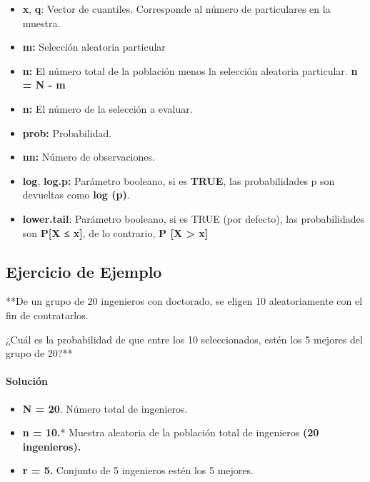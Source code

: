 \documentclass[
]{article}
\providecommand{\tightlist}{%
  \setlength{\itemsep}{0pt}\setlength{\parskip}{0pt}}
\begin{document}
\begin{itemize}
\item
  \textbf{x}, \textbf{q}: Vector de cuantiles. Corresponde al número de
  particulares en la muestra.
\item
  \textbf{m:} Selección aleatoria particular
\item
  \textbf{n:} El número total de la población menos la selección
  aleatoria particular. \textbf{n = N - m}
\item
  \textbf{n:} El número de la selección a evaluar.
\item
  \textbf{prob:} Probabilidad.
\item
  \textbf{nn:} Número de observaciones.
\item
  \textbf{log}, \textbf{log.p:} Parámetro booleano, si es \textbf{TRUE},
  las probabilidades p son devueltas como \textbf{log (p)}.
\item
  \textbf{lower.tail}: Parámetro booleano, si es TRUE (por defecto), las
  probabilidades son \textbf{P{[}X ≤ x{]}}, de lo contrario, \textbf{P
  {[}X \textgreater{} x{]}}
\end{itemize}

\hypertarget{ejercicio-de-ejemplo}{%
\subsection{Ejercicio de Ejemplo}\label{ejercicio-de-ejemplo}}

**De un grupo de 20 ingenieros con doctorado, se eligen 10
aleatoriamente con el fin de contratarlos.

¿Cuál es la probabilidad de que entre los 10 seleccionados, estén los 5
mejores del grupo de 20?**

\hypertarget{soluciuxf3n}{%
\paragraph{\texorpdfstring{\textbf{Solución}}{Solución}}\label{soluciuxf3n}}

\begin{itemize}
\tightlist
\item
  \textbf{N = 20}. Número total de ingenieros.
\item
  \textbf{n = 10.}* Muestra aleatoria de la población total de
  ingenieros \textbf{(20 ingenieros).}
\item
  \textbf{r = 5.} Conjunto de 5 ingenieros estén los 5 mejores.
\end{itemize}
\end{document}
